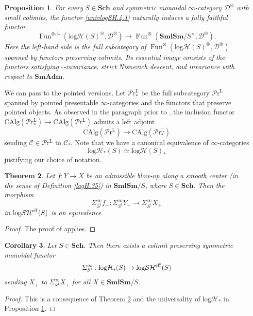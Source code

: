 \documentclass[11pt, a4paper]{amsart}
\newtheorem{thm}{Theorem}[subsection]
\newtheorem{prop}[thm]{Proposition}
\newtheorem{cor}[thm]{Corollary}
\theoremstyle{definition}
\numberwithin{equation}{subsection}
\newcommand{\Sch}{\mathbf{Sch}}
\newcommand{\SmlSm}{\mathbf{SmlSm}}
\newcommand{\SmAdm}{\mathbf{SmAdm}}
\newcommand{\boxx}{\square}
\newcommand{\eff}{{\rm eff}}
\newcommand{\Fun}{\operatorname{Fun}}
\newcommand{\LPr}{\mathcal{P}\mathrm{r}^{\mathrm{L}}}
\newcommand{\LPrpt}{\mathcal{P}\mathrm{r}^{\mathrm{L}}_{\ast}}
\newcommand{\CAlg}{\mathrm{CAlg}}
\newcommand{\infC}{\mathcal{C}}
\newcommand{\infD}{\mathcal{D}}
\newcommand{\inflogH}{\mathrm{log}\mathcal{H}}
\newcommand{\inflogHpt}{\mathrm{log}\mathcal{H}_\ast}
\newcommand{\inflogSH}{\mathrm{log}\mathcal{SH}}
\begin{document}
\begin{prop}
\label{univlogSH.4}
For every $S\in \Sch$ and symmetric monoidal $\infty$-category $\infD^\otimes$ with small colimits, 
the functor \eqref{univlogSH.4.1} naturally induces a fully faithful functor
\[
\Fun^{\otimes,\mathrm{L}}(\inflogH(S)^{\otimes},\infD^\otimes)
\to
\Fun^{\otimes}(\SmlSm/S^\times,\infD^\otimes).
\]
Here the left-hand side is the full subcategory of $\Fun^{\otimes}(\inflogH (S)^{\otimes},\infD^\otimes)$ 
spanned by functors preserving colimits.
Its essential image consists of the functors satisfying $\boxx$-invariance, strict Nisnevich descent, and invariance with respect to $\SmAdm$.
\end{prop}

We can pass to the pointed versions.
Let $\LPrpt$ be the full subcategory $\LPr$ spanned by pointed presentable $\infty$-categories 
and the functors that preserve pointed objects.
As observed in the paragraph prior to \cite[Corollary 2.32]{RobaloThesispublished}, 
the inclusion functor $\CAlg(\LPrpt)\to \CAlg(\LPr)$ admits a left adjoint
\begin{equation}
\label{univlogSH.3.2}
\CAlg(\LPr)\to \CAlg(\LPrpt)
\end{equation}
sending $\infC\in \LPr$ to $\infC_\ast$.
Note that we have a canonical equivalence of $\infty$-categories
\begin{equation}
\label{univlogSH.3.1}
\inflogH_{\ast}(S)
\simeq
\inflogH(S)_\ast
\end{equation}
justifying our choice of notation.



\begin{thm}
\label{Ori.68}
Let $f\colon Y\to X$ be an admissible blow-up along a smooth center (in the sense of Definition \ref{logH.35}) in $\SmlSm/S$,
where $S\in \Sch$.
Then the morphism
\[
\Sigma_{S^1}^\infty f_+
\colon
\Sigma_{S^1}^\infty Y_+
\to
\Sigma_{S^1}^\infty X_+
\]
in $\inflogSH^\eff(S)$ is an equivalence.
\end{thm}
\begin{proof}
The proof of \cite[Theorem 7.2.10]{logDM} applies.
\end{proof}

\begin{cor}
Let $S\in \Sch$.
Then there exists a colimit preserving symmetric monoidal functor
\[
\Sigma_{S^1}^\infty 
\colon
\inflogHpt(S)
\to
\inflogSH^\eff(S)
\]
sending $X_+$ to $\Sigma_{S^1}^\infty X_+$ for all $X\in \SmlSm/S$.
\end{cor}
\begin{proof}
This is a consequence of Theorem \ref{Ori.68} and the universality of $\inflogHpt$ in Proposition \ref{univlogSH.4}.
\end{proof}
\end{document}
